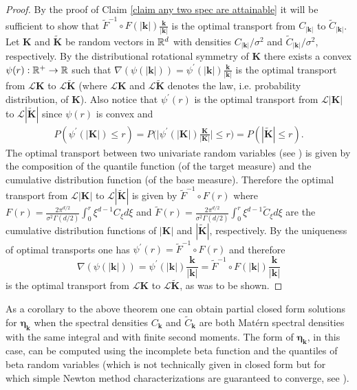 \documentclass[10pt,noinfoline]{imsart}
\newcommand{\bs}{\boldsymbol}
\begin{document}
\begin{proof}
By the proof of Claim \ref{claim any two spec are attainable} it will be sufficient to show that $\tilde F^{-1}\circ F(|\bs k|)\frac{\bs k}{|\bs k|}$ is the optimal transport from $C_{|\bs k|}$ to $\tilde C_{|\bs k|}$.
Let $\bs K$ and $\tilde {\bs K}$ be random vectors in $\Bbb R^d$ with densities $C_{|\bs k|}/\sigma^2$ and $\tilde C_{|\bs k|}/\sigma^2$, respectively. By the distributional rotational symmetry of $\bs K$ there exists a convex $\psi(r):\Bbb R^+ \rightarrow \Bbb R$ such that $\nabla (\psi(|\bs k|))=\psi^\prime(|\bs k|)\frac{\bs k}{|\bs k|}$ is the optimal transport from $\mathscr L\bs K$ to $\mathscr L\tilde{\bs K}$ (where $\mathscr L\bs K$ and $\mathscr L\tilde{\bs K}$ denotes the law, i.e. probability distribution, of $\bs K$). Also notice that $\psi^\prime(r)$ is the optimal transport from $\mathscr L |\bs K|$ to  $\mathscr L|\tilde{\bs K}|$ since $\psi(r)$ is convex and
\begin{align*}
P(\psi^\prime(|\bs K|)\leq r) = P\big(\big|\psi^\prime(|\bs K|)\textstyle\frac{\bs K}{|\bs K|}\big|\leq r\big) = P(|\tilde{\bs K}|\leq r).
\end{align*}
The optimal transport between two univariate random variables (see \cite{villani2003topics}) is given by the composition of the quantile function (of the target measure) and the cumulative distribution function (of the base measure). Therefore the optimal transport from $\mathscr L|\bs K|$ to $\mathscr L|\tilde{\bs K}|$ is given by $\tilde F^{-1}\circ F(r)$ where $F(r)=\frac{2\pi^{d/2}}{\sigma^2\Gamma(d/2)}\int_0^r \xi^{d-1}C_\xi d\xi$ and $\tilde F(r)=\frac{2\pi^{d/2}}{\sigma^2\Gamma(d/2)}\int_0^r \xi^{d-1}\tilde C_\xi d\xi$ are the cumulative distribution functions of $|\bs K|$ and $|\tilde{\bs K}|$, respectively. By the uniqueness of optimal transports one has $\psi^\prime(r)=\tilde F^{-1}\circ F(r)$ and therefore 
\[
\nabla (\psi(|\bs k|))=\psi^\prime(|\bs k|)\frac{\bs k}{|\bs k|} = \tilde F^{-1}\circ F(|\bs k|)\frac{\bs k}{|\bs k|}
\]
is the optimal transport from $\mathscr L\bs K$ to $\mathscr L\tilde{\bs K}$,
as was to be shown.
\end{proof}

As a corollary to the above theorem one can obtain partial closed form solutions for $\bs \eta_{\bs k}$ when the spectral densities $C_{\bs k}$ and $\tilde C_{\bs k}$ are both Mat\'ern spectral densities with the same integral and with finite second moments. The form of $\bs \eta_{\bs k}$, in this case, can be computed using the incomplete beta function and the quantiles of beta random variables (which is not technically given in closed form but for which simple Newton method characterizations are guaranteed to converge, see \cite{giner2014monotonically}).
\end{document}
